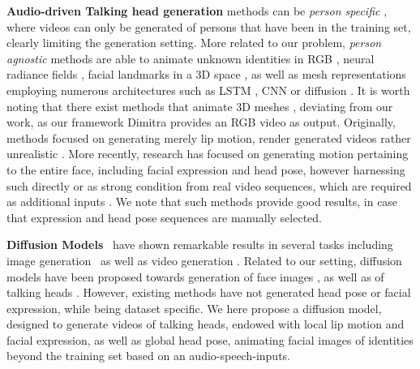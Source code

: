\textbf{Audio-driven Talking head generation} methods can be \textit{person specific} \cite{ji2021audio-driven,textbasedediting}, where videos can only be generated of persons that have been in the training set, clearly limiting the generation setting. More related to our problem, \textit{person agnostic} methods are able to animate unknown identities in RGB \cite{Zhou2021Pose,Wang_2023_CVPR}, neural radiance fields \cite{li2024ae}, facial landmarks in a 3D space \cite{gururani2022SPACE,wang2021audio2head}, as well as mesh representations \cite{ma2023styletalk,zhang2023sadtalker} employing numerous architectures such as LSTM \cite{10.1145/3414685.3417774}, CNN \cite{wav2lips} or diffusion \cite{wang2024eat,yu2023talking,shen2023difftalk}. It is worth noting that there exist methods that animate 3D meshes \cite{sun2024diffposetalk}, deviating from our work, as our framework Dimitra provides an RGB video as output. Originally, methods focused on generating merely lip motion, render generated videos rather unrealistic \cite{wav2lips}. More recently, research has focused on generating motion pertaining to the entire face, including facial expression and head pose, however harnessing such directly or as strong condition from real video sequences, which are required as additional inputs \cite{ma2023styletalk,ma2023dreamtalk}. We note that such methods provide good results, in case that expression and head pose sequences are manually selected. %

\textbf{Diffusion Models}~\cite{pmlr-v37-sohl-dickstein15,ho2020denoising} have shown remarkable results in several tasks including image generation~\cite{ho2020denoising,zhou2023shifted} as well as video generation \cite{harvey2022flexible,wu2023tune}. Related to our setting, diffusion models have been proposed towards generation of face images \cite{huang2023collaborative,kim2023dcface}, as well as of talking heads \cite{stypulkowski2024diffused,du2023dae}. However, existing methods have not generated head pose or facial expression, while being dataset specific. We here propose a diffusion model, designed to generate videos of talking heads, endowed with local lip motion and facial expression, as well as global head pose, animating facial images of identities beyond the training set based on an audio-speech-inputs. 

